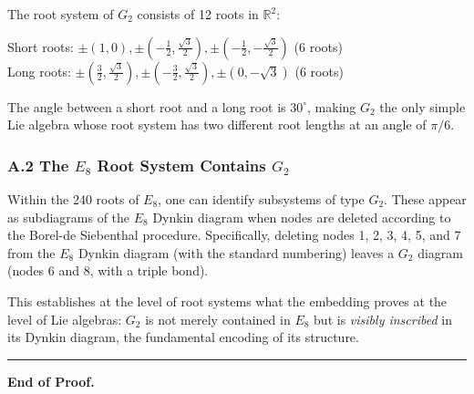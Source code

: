 \documentclass[12pt,a4paper]{article}
\begin{document}
The root system of $G_2$ consists of 12 roots in $\mathbb{R}^2$:

Short roots: $\pm(1,0), \pm(-\tfrac{1}{2}, \tfrac{\sqrt{3}}{2}), \pm(-\tfrac{1}{2}, -\tfrac{\sqrt{3}}{2})$ (6 roots) \\
Long roots: $\pm(\tfrac{3}{2}, \tfrac{\sqrt{3}}{2}), \pm(-\tfrac{3}{2}, \tfrac{\sqrt{3}}{2}), \pm(0, -\sqrt{3})$ (6 roots)

The angle between a short root and a long root is $30^\circ$, making $G_2$ the only simple Lie algebra whose root system has two different root lengths at an angle of $\pi/6$.

\subsubsection{A.2 The $E_8$ Root System Contains $G_2$}

Within the 240 roots of $E_8$, one can identify subsystems of type $G_2$. These appear as subdiagrams of the $E_8$ Dynkin diagram when nodes are deleted according to the Borel-de Siebenthal procedure. Specifically, deleting nodes 1, 2, 3, 4, 5, and 7 from the $E_8$ Dynkin diagram (with the standard numbering) leaves a $G_2$ diagram (nodes 6 and 8, with a triple bond).

This establishes at the level of root systems what the embedding proves at the level of Lie algebras: $G_2$ is not merely contained in $E_8$ but is \emph{visibly inscribed} in its Dynkin diagram, the fundamental encoding of its structure.

\begin{center}
\rule{0.5\textwidth}{0.4pt}
\end{center}

\textbf{End of Proof.}
\end{document}
